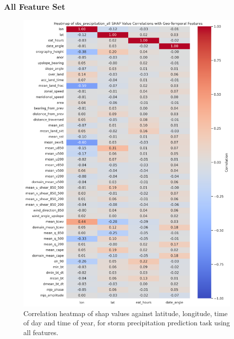 \subsubsection{All Feature Set}
\begin{figure}[ht]
    \centering
    \includegraphics[width=\textwidth]{../figures/generated/experiments/obs_precipitation/obs_precipitation_all_shap_correlation_heatmap.png}
    \caption{Correlation heatmap of \acrshort{shap} values against latitude, longitude, time of day and time of year, for storm precipitation prediction task using all features.}
    \label{fig:obs_precipitation_all_shap_heatmap}
\end{figure}

